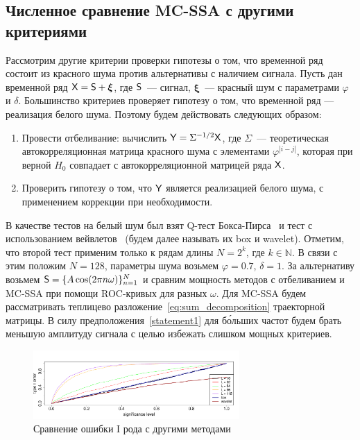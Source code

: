 \documentclass[specialist,
substylefile = spbu_report.rtx,
subf,href,colorlinks=true, 12pt]{disser}
\theoremstyle{definition}
\newcommand{\bfxi}{\boldsymbol{\xi}}
\begin{document}
\subsection{Численное сравнение MC-SSA с другими критериями}\label{sect:mc-ssa_comparison}
Рассмотрим другие критерии проверки гипотезы о том, что временной ряд состоит из красного шума против альтернативы с наличием сигнала. Пусть дан временной ряд $\tX=\tS+\bfxi$, где $\mathsf{S}$~--- сигнал, $\bfxi$~--- красный шум с параметрами $\varphi$ и $\delta$. Большинство критериев проверяет гипотезу о том, что временной ряд --- реализация белого шума. Поэтому будем действовать следующих образом:
\begin{enumerate}
	\item Провести отбеливание: вычислить $\mathsf{Y}=\Sigma^{-1/2}\mathsf{X}$, где $\Sigma$~--- теоретическая автокорреляционная матрица красного шума с элементами $\varphi^{|i-j|}$, которая при верной $H_0$ совпадает с автокорреляционной матрицей ряда $\mathsf{X}$.
	\item Проверить гипотезу о том, что $\mathsf{Y}$ является реализацией белого шума, с применением коррекции при необходимости.
\end{enumerate}
В качестве тестов на белый шум был взят Q-тест Бокса-Пирса~\cite{Box1970} и тест с использованием вейвлетов~\cite{Nason2014} (будем далее называть их box и wavelet). Отметим, что второй тест применим только к рядам длины $N=2^k$, где $k\in\mathbb{N}$. В связи с этим положим $N=128$, параметры шума возьмем $\varphi=0.7$, $\delta=1$. За альтернативу возьмем $\mathsf{S}=\{A\cos(2\pi n\omega)\}_{n=1}^N$ и сравним мощность методов с отбеливанием и MC-SSA при помощи ROC-кривых для разных $\omega$. Для MC-SSA будем рассматривать теплицево разложение~\eqref{eq:sum_decomposition} траекторной матрицы. В силу предположения~\ref{statement1} для б\'{о}льших частот будем брать меньшую амплитуду сигнала с целью избежать слишком мощных критериев.

\begin{figure}[h!]
	\centering
	\includegraphics[width=0.7\textwidth]{img/alphaI_testAR.pdf}
	\caption{Сравнение ошибки I рода с другими методами}
	\label{alphaI_testAR}
\end{figure}
\end{document}
